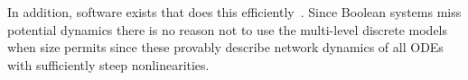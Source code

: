 \documentclass[12pt, notitlepage]{amsart}
\theoremstyle{definition}
\newcommand{\Tomas}[1]{{\color{red}{{\bf Tomas: }#1}}}
\begin{document}
In addition, software exists that does this efficiently~\cite{DSGRNRepository}.  Since Boolean systems miss potential dynamics there is no reason not to use the multi-level discrete models when size permits since these
provably describe network dynamics of all ODEs with sufficiently steep nonlinearities.



\end{document}
